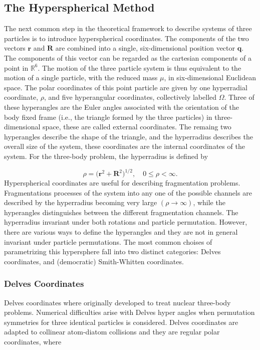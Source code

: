 \documentclass{article}
\numberwithin{equation}{section}
\begin{document}
\subsection{The Hyperspherical Method}
The next common step in the theoretical framework to describe systems of three particles is to introduce hyperspherical coordinates. The components of the two vectors $\mathbf{r}$ and $\mathbf{R}$ are combined into a single, six-dimensional position vector $\mathbf{q}$. The components of this vector can be regarded as the cartesian components of a point in $\mathbb{R}^{6}$. The motion of the three particle system is thus equivalent to the motion of a single particle, with the reduced mass $\mu$, in six-dimensional Euclidean space. The polar coordinates of this point particle are given by one hyperradial coordinate, $\rho$, and five hyperangular coordinates, collectively labelled $\Omega$. Three of these hyperangles are the Euler angles associated with the orientation of the body fixed frame (i.e., the triangle formed by the three particles) in three-dimensional space, these are called external coordinates. The remaing two hyperangles describe the shape of the triangle, and the hyperradius describes the overall size of the system, these coordinates are the internal coordinates of the system. For the three-body problem, the hyperradius is defined by

\begin{equation}
\rho = \Big(\mathbf{r}^{2} + \mathbf{R}^{2}\Big)^{1/2}, \quad 0\leq \rho < \infty.
\end{equation} 
Hyperspherical coordinates are useful for describing fragmentation problems. Fragmentations processes of the system into any one of the possible channels are described by the hyperradius becoming very large $(\rho \rightarrow \infty)$, while the hyperangles distinguishes between the different fragmentation channels. The hyperradius invariant under both rotations and particle permutation. However, there are various ways to define the hyperangles and they are not in general invariant under particle permutations. The most common choises of parametrizing this hypersphere fall into two distinct categories: Delves coordinates, and (democratic) Smith-Whitten coordinates. 

\subsubsection{Delves Coordinates}
Delves coordinates where originally developed to treat nuclear three-body problems. Numerical difficulties arise with Delves hyper angles when permutation symmetries for three identical particles is considered. Delves coordinates are adapted to collinear atom-diatom collisions and they are regular polar coordinates, where
\end{document}
